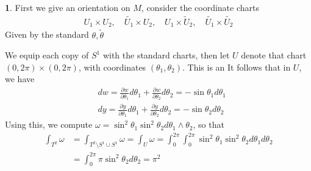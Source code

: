 \documentclass[10.5pt]{article}
\theoremstyle{definition}
\newtheorem{pb}{}
\begin{document}
    \begin{pb}
        First we give an orientation on \(M\), consider the coordinate charts
        \begin{align*}
            U_1 \times U_2, \quad \tilde{U_1} \times U_2, \quad U_1 \times \tilde U_2, \quad
            \tilde{U_1} \times \tilde{U_2}
        \end{align*}
        Given by the standard \(\theta,\tilde{\theta}\)

        We equip each copy of \(S^1\) with the standard charts, then let \(U\) denote that chart
        \((0,2\pi)\times(0,2\pi)\), with coordinates \((\theta_1,\theta_2)\). This is an 
        It follows that in \(U\), we have 
        \begin{align*}
            &dw = \frac{\partial w}{\partial \theta_1} d\theta_1 + \frac{\partial w}{\partial \theta_2} d\theta_2 = -\sin\theta_1 d\theta_1\\
            &dy = \frac{\partial y}{\partial \theta_1}d\theta_1 + \frac{\partial y}{\partial \theta_2}d\theta_2 = -\sin\theta_2 d\theta_2
        \end{align*}
        Using this, we compute
        \(\omega = \sin^2\theta_1\sin^2\theta_2 d\theta_1 \wedge \theta_2\), so that
        \begin{align*}
            \int_{T^2} \omega &= \int_{T^2 \setminus S^1 \cup S^1} \omega = \int_U \omega
            = \int_0^{2\pi}\int_0^{2\pi}\sin^2\theta_1\sin^2\theta_2 d\theta_1d\theta_2 \\
            &= \int_0^{2\pi}\pi\sin^2\theta_2d\theta_2 = \pi^2
        \end{align*}
        
    \end{pb}
\end{document}
